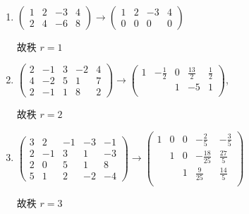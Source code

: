 	 \paragraph{} %
		 \begin{enumerate}
			 \item %
			       \( \begin{pmatrix}
				       1 & 2 & -3 & 4 \\
				       2 & 4 & -6 & 8
			       \end{pmatrix} \to
			       \begin{pmatrix}
				       1 & 2 & -3 & 4 \\
				       0 & 0 & 0  & 0
			       \end{pmatrix} \)

			       故秩 \( r = 1 \)
			 \item %
			       \( \begin{pmatrix}
				       2 & -1 & 3 & -2 & 4 \\
				       4 & -2 & 5 & 1  & 7 \\
				       2 & -1 & 1 & 8  & 2
			       \end{pmatrix} \to
			       \begin{pmatrix}
				       1 & -\frac{1}{2} & 0 & \frac{13}{2} & \frac{1}{2} \\
				         &              & 1 & -5           & 1           \\
				         &              &   &              &
			       \end{pmatrix} \),

			       故秩 \( r = 2 \)
			 \item %
			       \( \begin{pmatrix}
				       3 & 2  & -1 & -3 & -1 \\
				       2 & -1 & 3  & 1  & -3 \\
				       2 & 0  & 5  & 1  & 8  \\
				       5 & 1  & 2  & -2 & -4
			       \end{pmatrix} \to
			       \begin{pmatrix}
				       1 & 0 & 0 & -\frac{2}{5}   & -\frac{3}{5} \\
				         & 1 & 0 & -\frac{18}{25} & \frac{27}{5} \\
				         &   & 1 & \frac{9}{25}   & \frac{14}{5} \\
				         &   &   &                &
			       \end{pmatrix} \)

			       故秩 \( r = 3 \)
		 \end{enumerate}


